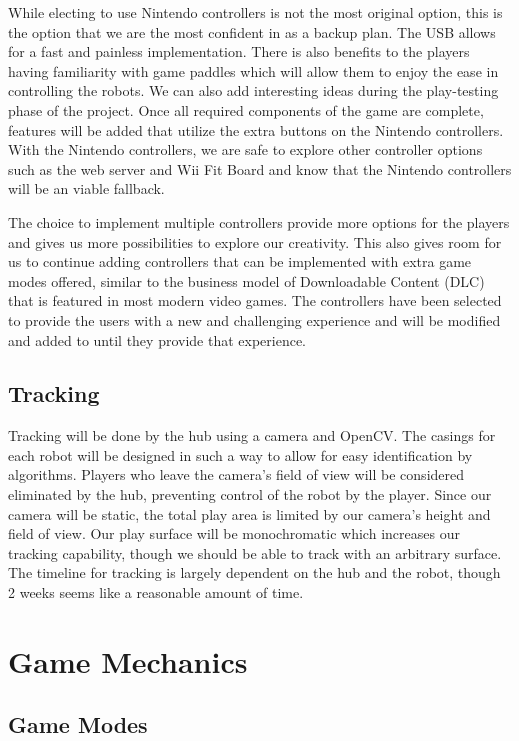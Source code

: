 \documentclass[11pt]{ieeeconf}
\begin{document}
While electing to use Nintendo controllers is not the most original option, this is the option that we are the most confident in as a backup plan. The USB allows for a fast and painless implementation. There is also benefits to the players having familiarity with game paddles which will allow them to enjoy the ease in controlling the robots. We can also add interesting ideas during the play-testing phase of the project. Once all required components of the game are complete, features will be added that utilize the extra buttons on the Nintendo controllers. With the Nintendo controllers, we are safe to explore other controller options such as the web server and Wii Fit Board and know that the Nintendo controllers will be an viable fallback. 

The choice to implement multiple controllers provide more options for the players and gives us more possibilities to explore our creativity. This also gives room for us to continue adding controllers that can be implemented with extra game modes offered, similar to the business model of Downloadable Content (DLC) that is featured in most modern video games. The controllers have been selected to provide the users with a new and challenging experience and will be modified and added to until they provide that experience. 

\subsection{Tracking}

Tracking will be done by the hub using a camera and OpenCV. The casings for each robot will be designed in such a way to allow for easy identification by algorithms. Players who leave the camera's field of view will be considered eliminated by the hub, preventing control of the robot by the player. Since our camera will be static, the total play area is limited by our camera's height and field of view. Our play surface will be monochromatic which increases our tracking capability, though we should be able to track with an arbitrary surface. The timeline for tracking is largely dependent on the hub and the robot, though 2 weeks seems like a reasonable amount of time.

\section{Game Mechanics}

\subsection{Game Modes}
\end{document}
